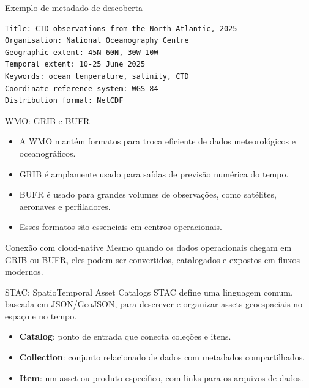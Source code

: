 \documentclass[aspectratio=169]{beamer}
\begin{document}
\begin{frame}[fragile]{Exemplo de metadado de descoberta}
\begin{lstlisting}[language={}]
Title: CTD observations from the North Atlantic, 2025
Organisation: National Oceanography Centre
Geographic extent: 45N-60N, 30W-10W
Temporal extent: 10-25 June 2025
Keywords: ocean temperature, salinity, CTD
Coordinate reference system: WGS 84
Distribution format: NetCDF
\end{lstlisting}
\end{frame}

\begin{frame}{WMO: GRIB e BUFR}
\begin{itemize}
  \item A WMO mantém formatos para troca eficiente de dados meteorológicos e oceanográficos.
  \item GRIB é amplamente usado para saídas de previsão numérica do tempo.
  \item BUFR é usado para grandes volumes de observações, como satélites, aeronaves e perfiladores.
  \item Esses formatos são essenciais em centros operacionais.
\end{itemize}

\vspace{0.4cm}

\begin{block}{Conexão com cloud-native}
Mesmo quando os dados operacionais chegam em GRIB ou BUFR, eles podem ser convertidos, catalogados e expostos em fluxos modernos.
\end{block}
\end{frame}

\begin{frame}{STAC: SpatioTemporal Asset Catalogs}
\Large
STAC define uma linguagem comum, baseada em JSON/GeoJSON, para descrever e organizar assets geoespaciais no espaço e no tempo.

\vspace{0.4cm}

\begin{itemize}
  \item \textbf{Catalog}: ponto de entrada que conecta coleções e itens.
  \item \textbf{Collection}: conjunto relacionado de dados com metadados compartilhados.
  \item \textbf{Item}: um asset ou produto específico, com links para os arquivos de dados.
\end{itemize}
\end{frame}
\end{document}
